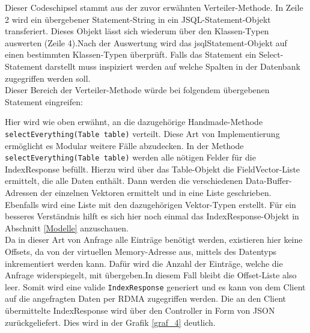 Dieser Codeschipsel stammt aus der zuvor erwähnten Verteiler-Methode. In Zeile 2  wird ein übergebener Statement-String in ein JSQL-Statement-Objekt transferiert. Dieses Objekt lässt sich wiederum über den Klassen-Typen auswerten (Zeile 4).Nach der Auswertung wird das jsqlStatement-Objekt auf einen bestimmten Klassen-Typen überprüft. Falls das Statement ein Select-Statement darstellt muss inspiziert werden auf welche Spalten in der Datenbank zugegriffen werden soll.\\ 
Dieser Bereich der Verteiler-Methode würde bei folgendem übergebenen Statement eingreifen:

\begin{center}
\end{center}

Hier wird wie oben erwähnt, an die dazugehörige Handmade-Methode \\ \texttt{selectEverything(Table table)} verteilt. Diese Art von Implementierung ermöglicht es Modular weitere Fälle abzudecken.
In der Methode \texttt{selectEverything(Table table)} werden alle nötigen Felder für die IndexResponse befüllt. Hierzu wird über das Table-Objekt die FieldVector-Liste ermittelt, die alle Daten enthält. Dann werden die verschiedenen Data-Buffer-Adressen der einzelnen Vektoren ermittelt und in eine Liste geschrieben. Ebenfalls wird eine Liste mit den dazugehörigen Vektor-Typen erstellt. Für ein besseres Verständnis hilft es sich hier noch einmal das IndexResponse-Objekt in Abschnitt \ref{Modelle} anzuschauen.\\
Da in dieser Art von Anfrage alle Einträge benötigt werden, existieren hier keine Offsets, da von der virtuellen Memory-Adresse aus, mittels des Datentyps inkrementiert werden kann. Dafür wird die Anzahl der Einträge, welche die Anfrage widerspiegelt, mit übergeben.In diesem Fall bleibt die Offset-Liste also leer.
Somit wird eine valide \texttt{IndexResponse} generiert und es kann von dem Client auf die angefragten Daten per RDMA zugegriffen werden. Die an den Client übermittelte IndexResponse wird über den Controller in Form von JSON zurückgeliefert. Dies wird in der Grafik \ref{graf_4} deutlich.

